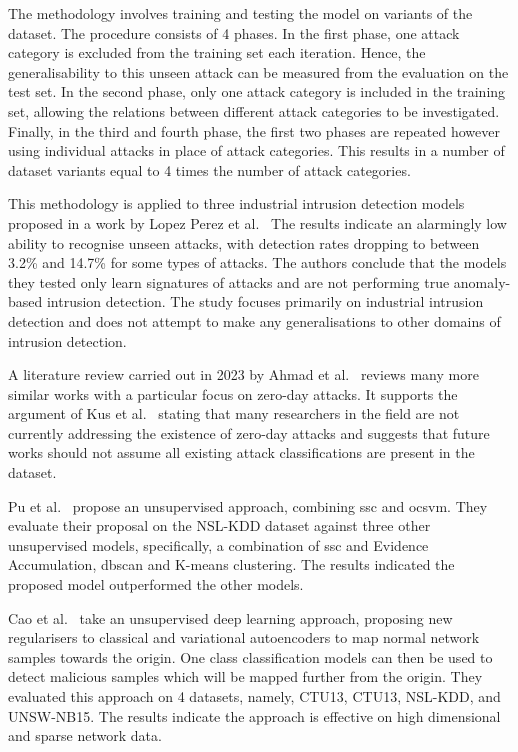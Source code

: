 The methodology involves training and testing the model on variants of the
dataset. The procedure consists of 4 phases. In the first phase, one attack
category is excluded from the training set each iteration. Hence, the
generalisability to this unseen attack can be measured from the evaluation on
the test set. In the second phase, only one attack category is included in the
training set, allowing the relations between different attack categories to be
investigated. Finally, in the third and fourth phase, the first two phases are
repeated however using individual attacks in place of attack categories. This
results in a number of dataset variants equal to 4 times the number of attack
categories.

This methodology is applied to three industrial intrusion detection models
proposed in a work by Lopez Perez et al.~\cite{Perez} The results indicate an
alarmingly low ability to recognise unseen attacks, with detection rates
dropping to between 3.2\% and 14.7\% for some types of attacks. The authors
conclude that the models they tested only learn signatures of attacks and are
not performing true anomaly-based intrusion detection. The study focuses
primarily on industrial intrusion detection and does not attempt to make any
generalisations to other domains of intrusion detection.

A literature review carried out in 2023 by Ahmad et al.~\cite{zero-day} reviews
many more similar works with a particular focus on zero-day attacks. It
supports the argument of Kus et al.~\cite{Kus} stating that many researchers in
the field are not currently addressing the existence of zero-day attacks and
suggests that future works should not assume all existing attack
classifications are present in the dataset.

Pu et al.~\cite{Pu} propose an unsupervised approach, combining \gls{ssc} and
\gls{ocsvm}. They evaluate their proposal on the NSL-KDD dataset against three
other unsupervised models, specifically, a combination of \gls{ssc} and
Evidence Accumulation, \gls{dbscan} and K-means clustering. The results indicated the
proposed model outperformed the other models.

Cao et al.~\cite{Cao} take an unsupervised deep learning approach, proposing new
regularisers to classical and variational autoencoders to map normal network
samples towards the origin. One class classification models can then be used to
detect malicious samples which will be mapped further from the origin. They
evaluated this approach on 4 datasets, namely, CTU13, CTU13, NSL-KDD,
and UNSW-NB15. The results indicate the approach is effective on high
dimensional and sparse network data.

